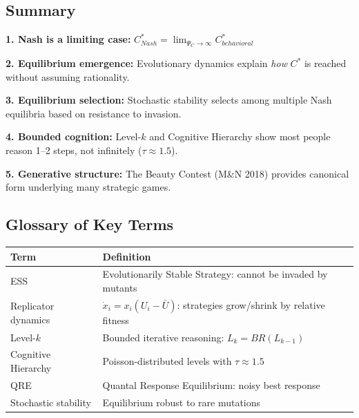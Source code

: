 \subsection{Summary}

\begin{tcolorbox}[colback=green!5!white, colframe=green!75!black,
    title=\textbf{Key Takeaways}]

\textbf{1. Nash is a limiting case:}
$C^*_{Nash} = \lim_{\Psi_C \to \infty} C^*_{behavioral}$

\textbf{2. Equilibrium emergence:} Evolutionary dynamics explain \textit{how}
$C^*$ is reached without assuming rationality.

\textbf{3. Equilibrium selection:} Stochastic stability selects among multiple
Nash equilibria based on resistance to invasion.

\textbf{4. Bounded cognition:} Level-$k$ and Cognitive Hierarchy show most people
reason 1--2 steps, not infinitely ($\tau \approx 1.5$).

\textbf{5. Generative structure:} The Beauty Contest (M\&N 2018) provides canonical
form underlying many strategic games.

\end{tcolorbox}

\subsection{Glossary of Key Terms}
\label{sec:ad-glossary}


\begin{center}
\renewcommand{\arraystretch}{1.3}
\begin{tabular}{@{}p{4cm}p{9cm}@{}}
\toprule
\textbf{Term} & \textbf{Definition} \\
\midrule
ESS & Evolutionarily Stable Strategy: cannot be invaded by mutants \\
Replicator dynamics & $\dot{x}_i = x_i(U_i - \bar{U})$: strategies grow/shrink by relative fitness \\
Level-$k$ & Bounded iterative reasoning: $L_k = BR(L_{k-1})$ \\
Cognitive Hierarchy & Poisson-distributed levels with $\tau \approx 1.5$ \\
QRE & Quantal Response Equilibrium: noisy best response \\
Stochastic stability & Equilibrium robust to rare mutations \\
\bottomrule
\end{tabular}
\end{center}

